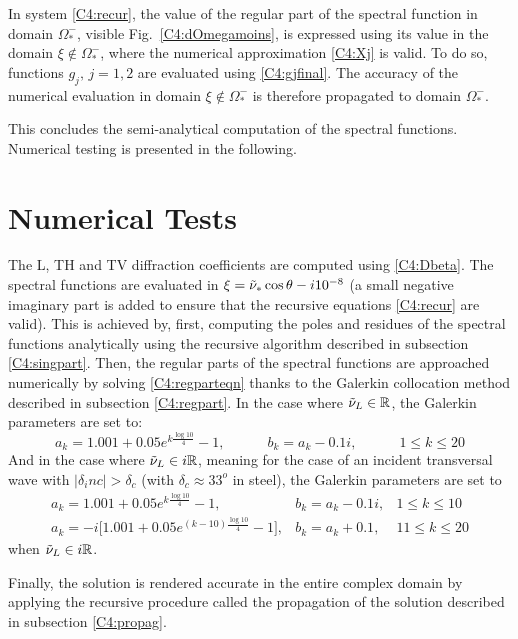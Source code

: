 In system \eqref{C4:recur}, the value of the regular part of the spectral function in domain $\Omega_*^-$, visible Fig.~\ref{C4:dOmegamoins}, is expressed using its value in the domain $\xi \notin \Omega_*^-$, where the numerical approximation \eqref{C4:Xj} is valid. To do so, functions $g_j,\, j=1,2$ are evaluated using \eqref{C4:gjfinal}. The accuracy of the numerical evaluation in domain $\xi \notin \Omega_*^-$ is therefore propagated to domain $\Omega_*^-$. 

This concludes the semi-analytical computation of the spectral functions. Numerical testing is presented in the following.

\section{Numerical Tests}
The L, TH and TV diffraction coefficients are computed using \eqref{C4:Dbeta}. The spectral functions are evaluated in $\xi=\tilde{\nu}_*\cos\theta -i10^{-8}$ (a small negative imaginary part is added to ensure that the recursive equations \eqref{C4:recur} are valid). This is achieved by, first, computing the poles and residues of the spectral functions analytically using the recursive algorithm described in subsection \ref{C4:singpart}. Then, the regular parts of the spectral functions are approached numerically by solving \eqref{C4:regparteqn} thanks to the Galerkin collocation method described in subsection \ref{C4:regpart}. In the case where $\tilde{\nu}_L \in \mathbb{R}$, the Galerkin parameters are set to:
\begin{equation}
a_k=1.001+0.05e^{k\frac{\log 10}{4}}-1, \hspace{3em} b_k=a_k-0.1i, \hspace{3em} 1\leq k\leq20
\end{equation}
And in the case where $\tilde{\nu}_L \in i\mathbb{R}$, meaning for the case of an incident transversal wave with $|\delta_inc|>\delta_c$ (with $\delta_c \approx 33^o$ in steel), the Galerkin parameters are set to
\begin{equation}
\begin{matrix}
a_k=1.001+0.05e^{k\frac{\log 10}{4}}-1, & b_k=a_k-0.1i, & 1\leq k\leq10\\
a_k=-i\lbrack 1.001+0.05e^{(k-10)\frac{\log 10}{4}}-1\rbrack, & b_k=a_k+0.1, & 11\leq k\leq20
\end{matrix}
\end{equation}
when $\tilde{\nu}_L \in i\mathbb{R}$.

Finally, the solution is rendered accurate in the entire complex domain by applying the recursive procedure called the propagation of the solution described in subsection \ref{C4:propag}.

